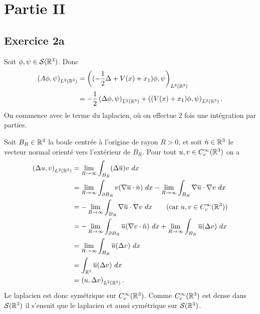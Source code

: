 
\section*{Partie II}

\subsection*{Exercice 2a}

Soit $\phi, \psi \in \mathcal{S}(\mathbb{R}^3)$. Donc
\begin{align}
    \left( A \phi, \psi \right)_{L^2(\mathbb{R}^3)} &= \left( (-\frac{1}{2} \Delta + V(x) + x_1) \phi, \psi \right)_{L^2(\mathbb{R}^3)} \\
    &= -\frac{1}{2} \left( \Delta \phi, \psi \right)_{L^2(\mathbb{R}^3)} + \left( (V(x) + x_1) \phi, \psi \right)_{L^2(\mathbb{R}^3)}.
\end{align}
%
On commence avec le terme du laplacien, où on effectue 2 fois
une intégration par parties.

Soit $B_R \in \mathbb{R}^3$ la boule centrée à l'origine de rayon $R > 0$,
et soit $\hat n \in \mathbb{R}^3$ le vecteur normal orienté vers l'extérieur
de $B_R$. Pour tout $u, v \in C_c^\infty(\mathbb{R}^3)$ on a
\begin{align}
    \pslt{\Delta u}{v}
    &= \limb \int_{B_R} (\Delta \overline u) v \ dx \\
%
    &= \limb \int_{\partial B_R}
    v (\nabla \overline u \cdot \hat n) \ dx
    - \limb \int_{B_R} \nabla \overline u \cdot \nabla v \ dx \\
%
    &= -\limb \int_{B_R} \nabla \overline u \cdot \nabla v \ dx
    \qquad (\text{car } u, v \in \cinfc) \\
%
    &= -\limb \int_{\partial B_R}
    \overline u (\nabla v \cdot \hat n) \ dx
    + \limb \int_{B_R} \overline u (\Delta v) \ dx \\
%
    &= \limb \int_{B_R} \overline u (\Delta v) \ dx \\
%
    &= \int_{\R^3} \overline u (\Delta v) \ dx \\
    &= \pslt{u}{\Delta v}.
\end{align}
%
Le laplacien est donc symétrique sur $C_c^\infty(\mathbb{R}^3)$. Comme
$C_c^\infty(\mathbb{R}^3)$ est dense dans $\mathcal{S}(\mathbb{R}^3)$ il s'ensuit que
le laplacien et aussi symétrique sur $\mathcal{S}(\mathbb{R}^3)$.

